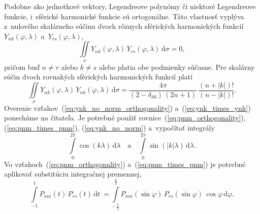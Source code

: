 \documentclass[a4paper,12pt]{book}
\newcommand{\diff}{\mathrm d}
\begin{document}
Podobne ako jednotkové vektory, Legendreove polynómy či niektoré Legendreove
funkcie, i~sférické harmonické funkcie sú ortogonálne.  Táto vlastnosť vyplýva
z~nulového skalárneho súčinu dvoch rôznych sférických harmonických funkcií
$Y_{nk}(\varphi, \lambda)$ a~$Y_{rs}(\varphi, \lambda)$,
%
\begin{equation}
\label{eq:ynk_no_norm_orthogonality}
\iint\limits_{\sigma} Y_{nk}(\varphi, \lambda) \, Y_{rs}(\varphi, \lambda) \, 
\diff \sigma = 0{,}
\end{equation}
%
pričom buď $n \neq r$ alebo $k \neq s$ alebo platia obe podmienky súčasne.  Pre
skalárny súčin dvoch rovnakých sférických harmonických funkcií platí
%
\begin{equation}
\label{eq:ynk_times_ynk}
\iint\limits_{\sigma} Y_{nk}(\varphi, \lambda) \, Y_{nk}(\varphi, \lambda) \, 
\diff \sigma =
%
\dfrac{4\pi}{(2 - \delta_{k0}) \, (2n + 1)} \, \dfrac{(n + |k|)!}{(n
- |k|)!}{.}
\end{equation}
%
Overenie vzťahov~(\ref{eq:ynk_no_norm_orthogonality})
a~(\ref{eq:ynk_times_ynk}) ponecháme na čitateľa.  Je potrebné použiť
rovnice~(\ref{eq:pnm_orthogonality}), (\ref{eq:pnm_times_pnm}),
(\ref{eq:ynk_no_norm}) a~vypočítať integrály
%
\begin{equation}
\int\limits_{0}^{2\pi} \cos(k \lambda) \, \diff\lambda \quad \text{a} \quad
\int\limits_{0}^{2\pi} \sin(|k| \lambda) \, \diff\lambda{.}
\end{equation}
%
Vo vzťahoch~(\ref{eq:pnm_orthogonality}) a~(\ref{eq:pnm_times_pnm}) je potrebné
aplikovať substitúciu integračnej premennej,
%
\begin{equation}
\int\limits_{-1}^{1} P_{nm}(t) \, P_{rs}(t) \, \diff
t~= \int\limits_{-\frac{\pi}{2}}^{\frac{\pi}{2}} P_{nm}(\sin\varphi) \,
P_{rs}(\sin\varphi) \, \cos\varphi \, \diff \varphi{.}
\end{equation}
\end{document}
